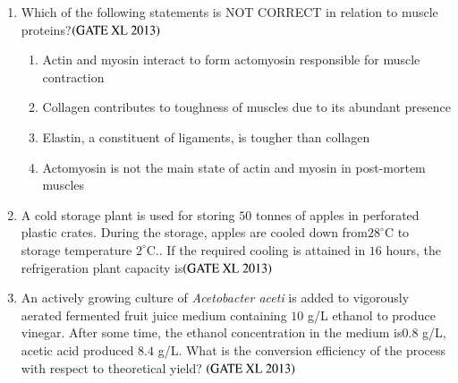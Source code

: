 \documentclass[journal]{IEEEtran}
\begin{document}
\begin{enumerate}
\item Which of the following statements is NOT CORRECT in relation to muscle proteins?\hfill $\left(\text{GATE XL 2013}\right)$
\begin{enumerate}
    \item Actin and myosin interact to form actomyosin responsible for muscle contraction
    \item Collagen contributes to toughness of muscles due to its abundant presence
    \item Elastin, a constituent of ligaments, is tougher than collagen
    \item Actomyosin is not the main state of actin and myosin in post-mortem muscles
\end{enumerate}

\item A cold storage plant is used for storing $50$ tonnes of apples  in perforated plastic crates. During the storage, apples are cooled down from$28^{\circ}$C to storage temperature $2^{\circ}$C.. If the required cooling is attained in $16$ hours, the refrigeration plant capacity  is\hfill $\left(\text{GATE XL 2013}\right)$
\begin{enumerate}
\end{enumerate}

\item An actively growing culture of \textit{Acetobacter aceti} is added to vigorously aerated fermented fruit juice medium containing  $10$ g/L ethanol to produce vinegar. After some time, the ethanol concentration in the medium is$0.8$ g/L, acetic acid produced $8.4$ g/L. What is the conversion efficiency of the process with respect to theoretical yield? \hfill $\left(\text{GATE XL 2013}\right)$
\begin{enumerate}
\end{enumerate}


\end{enumerate}
\end{document}
